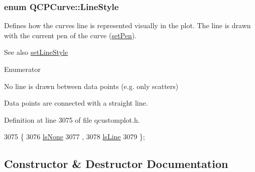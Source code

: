 \subsubsection[{Line\+Style}]{\setlength{\rightskip}{0pt plus 5cm}enum {\bf Q\+C\+P\+Curve\+::\+Line\+Style}}\label{class_q_c_p_curve_a2710e9f79302152cff794c6e16cc01f1}
Defines how the curve\textquotesingle{}s line is represented visually in the plot. The line is drawn with the current pen of the curve (\hyperlink{class_q_c_p_abstract_plottable_ab74b09ae4c0e7e13142fe4b5bf46cac7}{set\+Pen}). \begin{DoxySeeAlso}{See also}
\hyperlink{class_q_c_p_curve_a4a377ec863ff81a1875c3094a6177c19}{set\+Line\+Style} 
\end{DoxySeeAlso}
\begin{Desc}
\item[Enumerator]\par
\begin{description}
\item[{\em 
\hypertarget{class_q_c_p_curve_a2710e9f79302152cff794c6e16cc01f1aec1601a191cdf0b4e761c4c66092cc48}{}ls\+None\label{class_q_c_p_curve_a2710e9f79302152cff794c6e16cc01f1aec1601a191cdf0b4e761c4c66092cc48}
}]No line is drawn between data points (e.\+g. only scatters) \item[{\em 
\hypertarget{class_q_c_p_curve_a2710e9f79302152cff794c6e16cc01f1ade5822ce6fbf131d3df131795c2e1003}{}ls\+Line\label{class_q_c_p_curve_a2710e9f79302152cff794c6e16cc01f1ade5822ce6fbf131d3df131795c2e1003}
}]Data points are connected with a straight line. \end{description}
\end{Desc}


Definition at line 3075 of file qcustomplot.\+h.


\begin{DoxyCode}
3075                  \{
3076     \hyperlink{class_q_c_p_curve_a2710e9f79302152cff794c6e16cc01f1aec1601a191cdf0b4e761c4c66092cc48}{lsNone} 
3077     ,
3078     \hyperlink{class_q_c_p_curve_a2710e9f79302152cff794c6e16cc01f1ade5822ce6fbf131d3df131795c2e1003}{lsLine} 
3079   \};
\end{DoxyCode}


\subsection{Constructor \& Destructor Documentation}
\hypertarget{class_q_c_p_curve_a36de58e2652b3fa47bdf9187d421d3ce}{}
